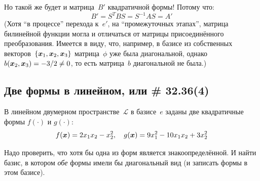 \documentclass[a4paper,12pt]{article}
\theoremstyle{remark}
\begin{document}
\begin{solution}
    Но такой же будет и матрица~$B'$ квадратичной формы!
    Потому что:
    \[
      B' = S^T B S = S^{-1} A S = A'
    \]
    (Хотя ``в процессе'' перехода к~$e'$, на ``промежуточных этапах'', матрица билинейной функции могла и отличаться от матрицы присоединённого преобразования.
    Имеется в виду, что, например, в базисе из собственных векторов~$\{\boldsymbol x_1, \boldsymbol x_2, \boldsymbol x_3\}$ матрица~$\phi$ уже была диагональной, однако $b(\bds x_2, \bds x_3) \hm= -3/2 \hm{\not=} 0$, то есть матрица~$b$ диагональной не была.)
  \end{solution}
  
  
  \subsection{Две формы в линейном, или \# 32.36(4)}
  
  В линейном двумерном пространстве~$\mathcal L$ в базисе~$e$ заданы две квадратичные формы $f(\cdot)$ и $g(\cdot)$:
  \[
    f(\boldsymbol x) = 2 x_1 x_2 - x_2^2,
    \quad g(\boldsymbol x) = 9 x_1^2 - 10 x_1 x_2 + 3 x_2^2
  \]
  
  Надо проверить, что хотя бы одна из форм является знакоопределённой.
  И найти базис, в котором \emph{обе} формы имели бы диагональный вид (и записать формы в этом базисе).
  
\end{document}
